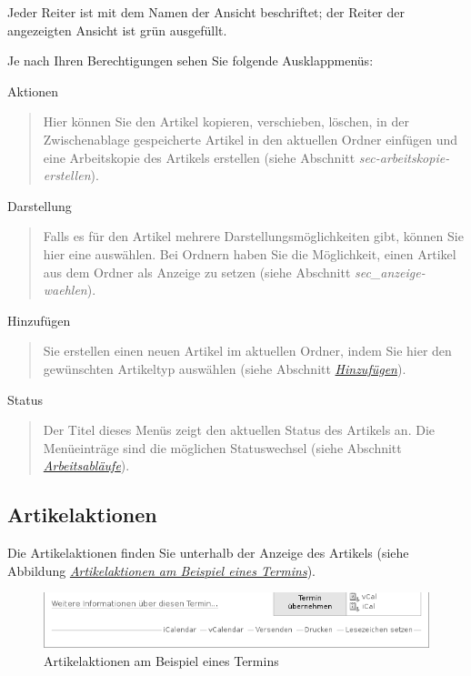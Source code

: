 \documentclass[a4paper,12pt,ngerman]{manual}
\begin{document}
Jeder Reiter ist mit dem Namen der Ansicht beschriftet; der Reiter der
angezeigten Ansicht ist grün ausgefüllt.

Je nach Ihren Berechtigungen sehen Sie folgende Ausklappmenüs:

Aktionen
\begin{quote}

Hier können Sie den Artikel kopieren, verschieben, löschen, in der
Zwischenablage gespeicherte Artikel in den aktuellen Ordner einfügen
und eine Arbeitskopie des Artikels erstellen (siehe Abschnitt
\emph{sec-arbeitskopie-erstellen}).
\end{quote}

Darstellung
\begin{quote}

Falls es für den Artikel mehrere Darstellungsmöglichkeiten gibt,
können Sie hier eine auswählen. Bei Ordnern haben Sie die
Möglichkeit, einen Artikel aus dem Ordner als Anzeige zu setzen
(siehe Abschnitt \emph{sec\_anzeige-waehlen}).
\end{quote}

Hinzufügen
\begin{quote}

Sie erstellen einen neuen Artikel im aktuellen Ordner, indem
Sie hier den gewünschten Artikeltyp auswählen (siehe
Abschnitt \hyperlink{sec-artikel-erstellen}{\emph{Hinzufügen}}).
\end{quote}

Status
\begin{quote}

Der Titel dieses Menüs zeigt den aktuellen Status des Artikels
an. Die Menüeinträge sind die möglichen Statuswechsel (siehe
Abschnitt \hyperlink{sec-workflow}{\emph{Arbeitsabläufe}}).
\end{quote}


\subsection{Artikelaktionen}

Die Artikelaktionen finden Sie unterhalb der Anzeige des Artikels
(siehe Abbildung \hyperlink{fig-doc-actions}{\emph{Artikelaktionen am Beispiel eines Termins}}).
\hypertarget{fig-doc-actions}{}\begin{figure}[htbp]
\centering

\includegraphics{doc-actions.png}
\caption{Artikelaktionen am Beispiel eines Termins}\end{figure}
\end{document}
